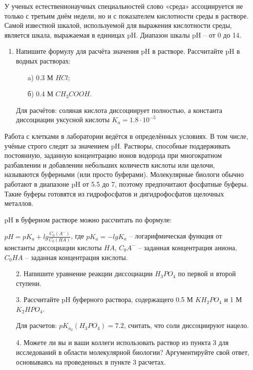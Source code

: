 
У ученых естественнонаучных специальностей слово «среда» ассоциируется не только с третьим днём недели, 
но и с показателем кислотности среды в растворе. Самой известной шкалой, используемой для выражения 
кислотности среды, является шкала, выражаемая в единицах pH. Диапазон шкалы pH – от 0 до 14.

\begin{enumerate}
    \item Напишите формулу для расчёта значения pH в растворе. Рассчитайте pH в водных растворах:
    \begin{enumerate}
        \item[a)] 0.3 М $HCl$;
        \item[б)] 0.4 М $CH_3COOH$.
    \end{enumerate}
        
    Для расчётов: соляная кислота диссоциирует полностью, а константа диссоциации уксусной кислоты $K_a = 1.8 \cdot 10^{-5}$
\end{enumerate}

Работа с клетками в лаборатории ведётся в определённых условиях. В том числе, учёные строго следят за значением 
pH. Растворы, способные поддерживать постоянную, заданную концентрацию ионов водорода при многократном разбавлении 
и добавлении небольших количеств кислоты или щелочи, называются буферными (или просто буферами). Молекулярные 
биологи обычно работают в диапазоне pH от 5.5 до 7, поэтому предпочитают фосфатные буферы. Такие буферы готовятся 
из гидрофосфатов и дигидрофосфатов щелочных металлов.

pH в буферном растворе можно рассчитать по формуле:

$pH = pK_a + lg \frac{C_0 (A^-)}{C_0 (HA)}$, где $pK_a = -lgK_a$ – логарифмическая функция от константы диссоциации кислоты $HA$, 
$C_0A^-$ – заданная концентрация аниона, $C_0HA$ – заданная концентрация кислоты.

\begin{enumerate}
    \item[2.] Напишите уравнение реакции диссоциации $H_3PO_4$ по первой и второй ступени.
    \item[3.] Рассчитайте pH буферного раствора, содержащего 0.5 М $KH_2PO_4$ и 1 М $K_2HPO_4$.
    
    Для расчетов: $pK_{a_2} (H_3PO_4) = 7.2$, считать, что соли диссоциируют нацело.

    \item[4.] Можете ли вы и ваши коллеги использовать раствор из пункта 3 для исследований в области 
    молекулярной биологии? Аргументируйте свой ответ, основываясь на проведенных в пункте 3 расчетах.
\end{enumerate}

